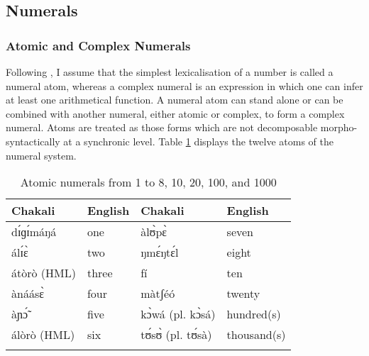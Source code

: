 \begin{exe}
\begin{exe}
\begin{exe}
{\begin{exe}
\begin{exe}
\begin{exe}
\begin{exe}
\begin{exe}
\begin{exe}
\begin{exe}
\begin{exe}
\begin{exe}
 \subsection{Numerals}
\label{sec:GRM-numeral}


\subsubsection{Atomic and Complex Numerals}
\label{sec:NUM-bas-comp}


Following \citet[263]{Gree78b}, I assume that  the simplest lexicalisation of a 
number is called a numeral
atom, whereas a complex numeral is an expression in which  one can infer at
least one arithmetical function.  A numeral atom can stand alone or can
be combined
with another numeral, either atomic or complex, to form a complex numeral. Atoms
are treated as  those forms which are not decomposable morpho-syntactically at a
synchronic level. Table \ref{tab:numeralatoms} displays the twelve
atoms of the numeral system.

 \begin{table}[!h]
  \caption{Atomic numerals from 1 to 8, 10, 20, 100, and 1000
\label{tab:numeralatoms}}
   \centering
  \begin{tabular}{llll}
\lsptoprule
Chakali &  English &  Chakali &  English\\ \midrule
 dɪ́ɡɪ́máŋá & one &   àlʊ̀pɛ̀   &seven\\    
álɪ́ɛ̀ &two   &   ŋmɛ́ŋtɛ́l &eight\\     
átòrò (HML) &three &   fí &ten\\   
ànáásɛ̀ &four & màtʃéó  &twenty\\     
 àɲɔ̃́ &five  &  kɔ̀wá (pl.  kɔ̀sá)   & hundred(s)\\  
  álòrò (HML)   &six &   tʊ́sʊ̀  (pl.  tʊ́sà) &thousand(s)\\    
 
\lspbottomrule
\end{tabular}
\end{table}


\end{exe}
\end{exe}
\end{exe}
\end{exe}
\end{exe}
\end{exe}
\end{exe}
\end{exe}
\end{exe}}
\end{exe}
\end{exe}
\end{exe}
